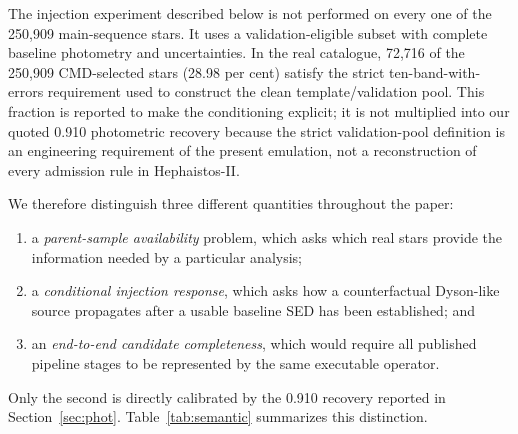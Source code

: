 \documentclass[fleqn,usenatbib]{mnras}
\begin{document}
The injection experiment described below is not performed on every one of the 250,909 main-sequence stars. It uses a validation-eligible subset with complete baseline photometry and uncertainties. In the real catalogue, 72,716 of the 250,909 CMD-selected stars (28.98 per cent) satisfy the strict ten-band-with-errors requirement used to construct the clean template/validation pool. This fraction is reported to make the conditioning explicit; it is not multiplied into our quoted 0.910 photometric recovery because the strict validation-pool definition is an engineering requirement of the present emulation, not a reconstruction of every admission rule in Hephaistos-II.

We therefore distinguish three different quantities throughout the paper:
\begin{enumerate}
\item a \emph{parent-sample availability} problem, which asks which real stars provide the information needed by a particular analysis;
\item a \emph{conditional injection response}, which asks how a counterfactual Dyson-like source propagates after a usable baseline SED has been established; and
\item an \emph{end-to-end candidate completeness}, which would require all published pipeline stages to be represented by the same executable operator.
\end{enumerate}
Only the second is directly calibrated by the 0.910 recovery reported in Section~\ref{sec:phot}. Table~\ref{tab:semantic} summarizes this distinction.
\end{document}
